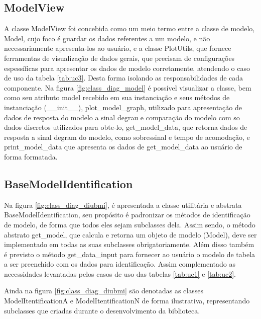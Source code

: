\subsection{ModelView}

A classe ModelView foi concebida como um meio termo entre a classe de modelo, Model, cujo foco é guardar os dados
referentes a um modelo, e não necessariamente apresenta-los ao usuário, e a classe PlotUtils, que fornece ferramentas
de visualização de dados gerais, que precisam de configurações espessíficas para apresentar os dados de modelo
corretamente, atendendo o caso de uso da tabela \ref{tab:uc3}.
Desta forma isolando as responsabilidades de cada componente.
Na figura \ref{fig:class_diag_model} é possível visualizar a classe, bem como seu atributo model recebido em sua
instanciação e seus métodos de instanciação (\_\_init\_\_), plot\_model\_graph, utilizado para apresentação de dados de
resposta do modelo a sinal degrau e comparação do modelo com so dados discretos utilizados para obte-lo,
get\_model\_data, que retorna dados de resposta a sinal degram do modelo, como sobressinal e tempo de acomodação, e
print\_model\_data que apresenta os dados de get\_model\_data ao usuário de forma formatada.

\subsection{BaseModelIdentification}

Na figura \ref{fig:class_diag_diubmi}, é apresentada a classe utilitária e abstrata BaseModelIdentification, seu
propósito é padronizar os métodos de identificação de modelo, de forma que todos eles sejam subclasses dela.
Assim sendo, o método abstrato get\_model, que calcula e retorna um objeto de modelo (Model), deve ser implementado em
todas as suas subclasses obrigatoriamente.
Além disso também é previsto o método get\_data\_input para fornecer ao usuário o modelo de tabela a ser preenchido
com os dados para identificação.
Assim complementado as necessidades levantadas pelos casos de uso das tabelas \ref{tab:uc1} e \ref{tab:uc2}.

Ainda na figura \ref{fig:class_diag_diubmi} são denotadas as classes ModelItentificationA e ModelItentificationN de
forma ilustrativa, representando subclasses que criadas durante o desenvolvimento da biblioteca.

